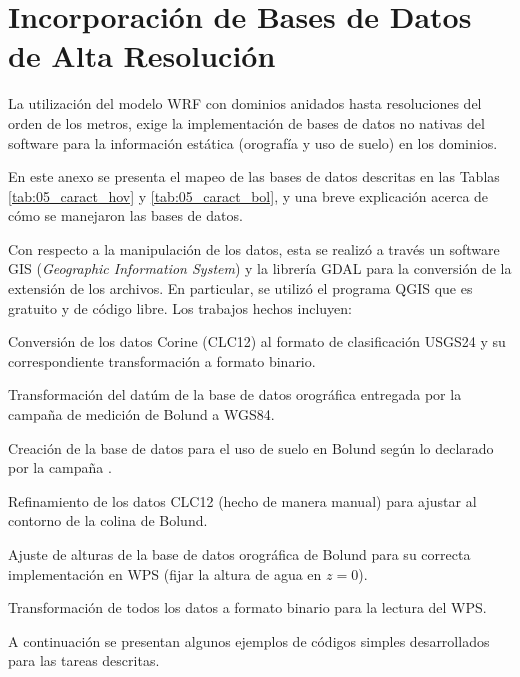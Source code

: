 \chapter{Incorporación de Bases de Datos de Alta Resolución}
La utilización del modelo WRF con dominios anidados hasta resoluciones del orden de los metros, exige la implementación de bases de datos no nativas del software para la información estática (orografía y uso de suelo) en los dominios.

En este anexo se presenta el mapeo de las bases de datos descritas en las Tablas \ref{tab:05_caract_hov} y \ref{tab:05_caract_bol}, y una breve explicación acerca de cómo se manejaron las bases de datos.

Con respecto a la manipulación de los datos, esta se realizó a través un software GIS (\emph{Geographic Information System}) y la librería GDAL para la conversión de la extensión de los archivos. En particular, se utilizó el programa QGIS que es gratuito y de código libre. Los trabajos hechos incluyen:
\begin{itemize*}
	\item Conversión de los datos Corine (CLC12) al formato de clasificación USGS24 y su correspondiente transformación a formato binario.
	\item Transformación del datúm de la base de datos orográfica entregada por la campaña de medición de Bolund a WGS84.
	\item Creación de la base de datos para el uso de suelo en Bolund según lo declarado por la campaña \citep{3d4285ac04444eb3b9775baf9af052c6}.
	\item Refinamiento de los datos CLC12 (hecho de manera manual) para ajustar al contorno de la colina de Bolund.
	\item Ajuste de alturas de la base de datos orográfica de Bolund para su correcta implementación en WPS (fijar la altura de agua en $z=0$).
	\item Transformación de todos los datos a formato binario para la lectura del WPS.
\end{itemize*}

A continuación se presentan algunos ejemplos de códigos simples desarrollados para las tareas descritas.

